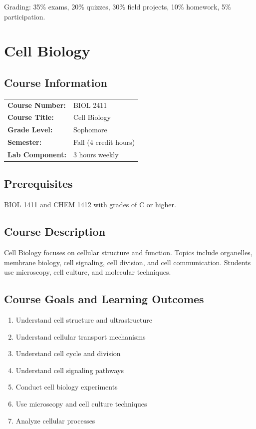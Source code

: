 \documentclass[12pt,oneside]{book}
\begin{document}
Grading: 35\% exams, 20\% quizzes, 30\% field projects, 10\% homework, 5\% participation.


\chapter{Cell Biology}

\section{Course Information}

\begin{tabular}{ll}
\textbf{Course Number:} & BIOL 2411 \\
\textbf{Course Title:} & Cell Biology \\
\textbf{Grade Level:} & Sophomore \\
\textbf{Semester:} & Fall (4 credit hours) \\
\textbf{Lab Component:} & 3 hours weekly \\
\end{tabular}

\section{Prerequisites}

BIOL 1411 and CHEM 1412 with grades of C or higher.

\section{Course Description}

Cell Biology focuses on cellular structure and function. Topics include organelles, membrane biology, cell signaling, cell division, and cell communication. Students use microscopy, cell culture, and molecular techniques.

\section{Course Goals and Learning Outcomes}

\begin{enumerate}
    \item Understand cell structure and ultrastructure
    \item Understand cellular transport mechanisms
    \item Understand cell cycle and division
    \item Understand cell signaling pathways
    \item Conduct cell biology experiments
    \item Use microscopy and cell culture techniques
    \item Analyze cellular processes
\end{enumerate}
\end{document}
